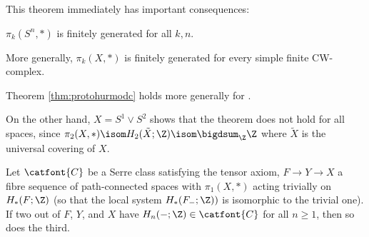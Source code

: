 This theorem immediately has important consequences:
\begin{corollary}\label{crl:htpygrpsofspheresfg}
	$\pi_k(S^n, *)$ is finitely generated for all $k, n$.
\end{corollary}
\begin{corollary}
	More generally, $\pi_k(X, *)$ is finitely generated for every simple finite CW-complex.
\end{corollary}
\begin{remark}
	Theorem \ref{thm:protohurmodc} holds more generally for .

	On the other hand, $X = S^1 \vee S^2$ shows that the theorem does not hold for all spaces, since $\pi_2(X, *) \isom H_2(\tilde{X}; \Z) \isom \bigdsum_{\Z} \Z$ where $\tilde{X}$ is the universal covering of $X$.
\end{remark}
\begin{lemma}\label{lmm:twointhreeserreclass}
	Let $\catfont{C}$ be a Serre class satisfying the tensor axiom, $F \to Y \to X$ a fibre sequence of path-connected spaces with $\pi_1(X, *)$ acting trivially on $H_*(F; \Z)$ (so that the local system $H_*(F_{-}; \Z))$ is isomorphic to the trivial one).
	If two out of $F$, $Y$, and $X$ have $H_n({{-}}; \Z) \in \catfont{C}$ for all $n \geq 1$, then so does the third.
\end{lemma}
